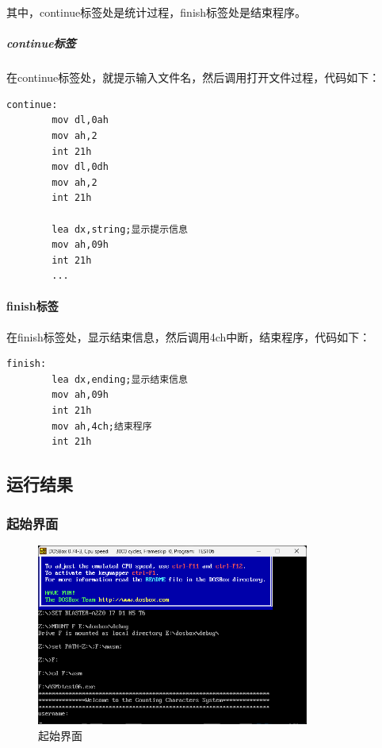 \documentclass[UTF8,12pt]{article}
\begin{document}
其中，continue标签处是统计过程，finish标签处是结束程序。

\subparagraph{continue标签}
在continue标签处，就提示输入文件名，然后调用打开文件过程，代码如下：

\begin{lstlisting}[title=continue标签,frame=shadowbox]
    continue:
		mov dl,0ah
        mov ah,2
        int 21h
        mov dl,0dh
        mov ah,2
        int 21h
		
        lea dx,string;显示提示信息
        mov ah,09h
        int 21h
        ...
\end{lstlisting}

\paragraph{finish标签}
在finish标签处，显示结束信息，然后调用4ch中断，结束程序，代码如下：

\begin{lstlisting}[title=finish标签,frame=shadowbox]
    finish:
        lea dx,ending;显示结束信息
        mov ah,09h
        int 21h
        mov ah,4ch;结束程序
        int 21h
\end{lstlisting}

\subsection{运行结果}
\subsubsection{起始界面}
\begin{figure}[htbp]
    \centering
    \includegraphics[width=0.8\textwidth]{img/1.png}
    \caption{起始界面}
\end{figure}

\newpage
\end{document}
